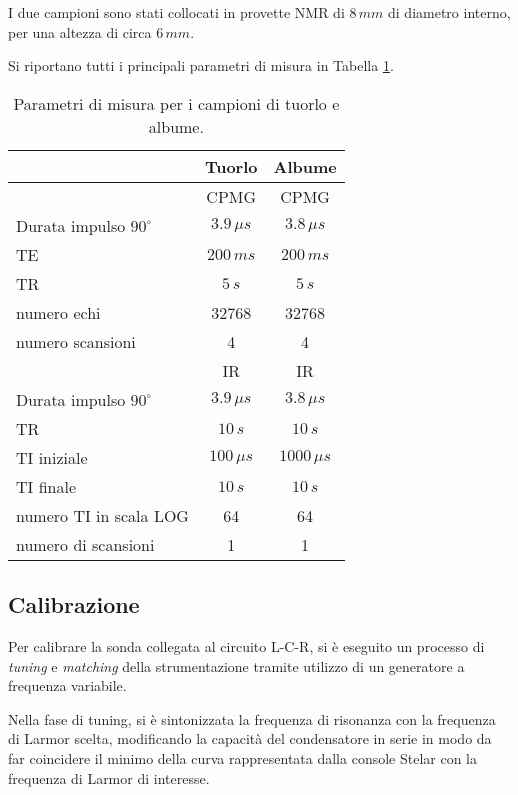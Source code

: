 I due campioni sono stati collocati in provette NMR di $8\si{\,}{mm}$ di diametro interno, per una altezza di circa $6\si{\,}{mm}$.

Si riportano tutti i principali parametri di misura in Tabella \ref{tab:setup}.

\begin{table}[h!]
	\centering
	\begin{tabular}{|l|c|c|}
	\toprule
						& \textbf{Tuorlo}& \textbf{Albume}	\\
	\midrule
						& CPMG 			& CPMG 				\\
	\midrule
	Durata impulso $90^{\circ}$ & $3.9\si{\,}{\mu s} $& $3.8\si{\,}{\mu s}$ \\
	TE 					& $200\si{\,}{ms} $	& $200\si{\,}{ms}$ \\
	TR 					& $5\si{\,}{s}$ 	& $5\si{\,}{s}$ \\
	numero echi 		& 32768 		& 32768 \\
	numero scansioni 	& 4 			& 4 \\
	\midrule
	\midrule
						& IR			& IR				\\
	\midrule
	Durata impulso $90^{\circ}$ & $3.9\si{\,}{\mu s} $& $3.8\si{\,}{\mu s}$ \\
	TR 					& $10\si{\,}{s}$	& $10\si{\,}{s}$ \\
	TI iniziale 	 	&$100\si{\,}{\mu s}$& $1000\si{\,}{\mu s}$ \\
	TI finale 		 	& $10\si{\,}{s}$	& $10\si{\,}{s}$ \\
	numero TI in scala LOG & 64			& 64 \\
	numero di scansioni & 1				& 1 \\
	\bottomrule
	\end{tabular}
	\caption{Parametri di misura per i campioni di tuorlo e albume.}
	\label{tab:setup}
\end{table}


\subsection*{Calibrazione}

Per calibrare la sonda collegata al circuito L-C-R, si è eseguito un processo di \textit{tuning} e \textit{matching} della strumentazione tramite utilizzo di un generatore a frequenza variabile.

Nella fase di tuning, si è sintonizzata la frequenza di risonanza con la frequenza di Larmor scelta, modificando la capacità del condensatore in serie in modo da far coincidere il minimo della curva rappresentata dalla console Stelar con la frequenza di Larmor di interesse.

